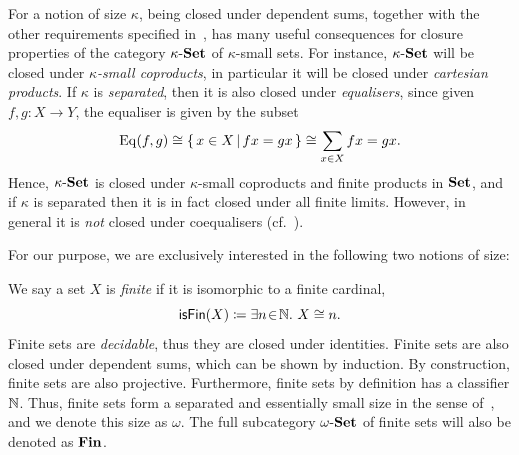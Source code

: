 \begin{remark}\label{rem:closurepropofkappa}
  For a notion of size $\kappa$, being closed under dependent sums, together with the other requirements specified in~, has many useful consequences for closure properties of the category $\kappa\text{-}\mathbf{Set}$ of $\kappa$-small sets. For instance, $\kappa\text{-}\mathbf{Set}$ will be closed under \emph{$\kappa$-small coproducts}, in particular it will be closed under \emph{cartesian products}. If $\kappa$ is \emph{separated}, then it is also closed under \emph{equalisers}, since given $f,g \colon X \to Y$, the equaliser is given by the subset 
  \[ \mathrm{Eq}(f,g) \cong \left\{\,x\in X\,\middle|\,fx = gx\,\right\} \cong \sum_{x\in X}fx = gx. \]
  Hence, $\kappa\text{-}\mathbf{Set}$ is closed under $\kappa$-small coproducts and finite products in $\mathbf{Set}$, and if $\kappa$ is separated then it is in fact closed under all finite limits. However, in general it is \emph{not} closed under coequalisers (cf.~).
\end{remark}

For our purpose, we are exclusively interested in the following two notions of size:

\begin{example}\label{exa:finitesize}
  We say a set $X$ is \emph{finite} if it is isomorphic to a finite cardinal,
  \[ \mathsf{isFin}(X) \coloneq \exists n\!\in\!\mathbb{N}.\  X \cong n. \]
  Finite sets are \emph{decidable}, thus they are closed under identities. Finite sets are also closed under dependent sums, which can be shown by induction. By construction, finite sets are also projective. Furthermore, finite sets by definition has a classifier $\mathbb{N}$. Thus, finite sets form a separated and essentially small size in the sense of~, and we denote this size as $\omega$. The full subcategory $\omega\text{-}\mathbf{Set}$ of finite sets will also be denoted as $\mathbf{Fin}$. 
\end{example}

